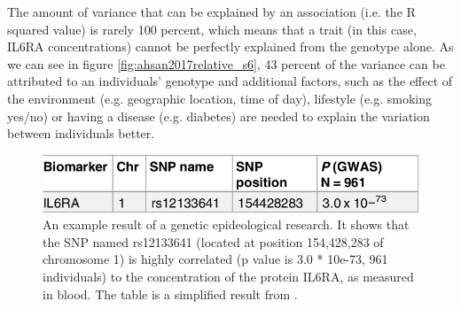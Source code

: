 The amount of variance that can be explained by an association (i.e.
the R squared value) is rarely 100 percent, which means that a trait (in
this case, IL6RA concentrations) cannot be perfectly explained
from the genotype alone. As we can see in figure \ref{fig:ahsan2017relative_s6}, 
43 percent of the variance can be attributed to an individuals'
genotype and additional factors, 
such as the effect
of the environment (e.g. geographic location, time of day), 
lifestyle (e.g. smoking yes/no) or having a disease (e.g. diabetes) 
are needed to explain the variation between individuals better.

\begin{figure}[!htbp]
  \centering
  \includegraphics[width=\linewidth]{ahsan2017relative_table_2_sub.png}
  \caption{
    An example result of a genetic epideological research.
    It shows that the SNP named rs12133641 (located at position 154,428,283
    of chromosome 1) is highly correlated (p value is 3.0 * 10e-73, 
    961 individuals) to the concentration of the protein IL6RA, as measured
    in blood. The table is a simplified result from \cite{ahsan2017relative}.
  }
  \label{fig:ahsan2017relative_table_2_sub}
\end{figure}


